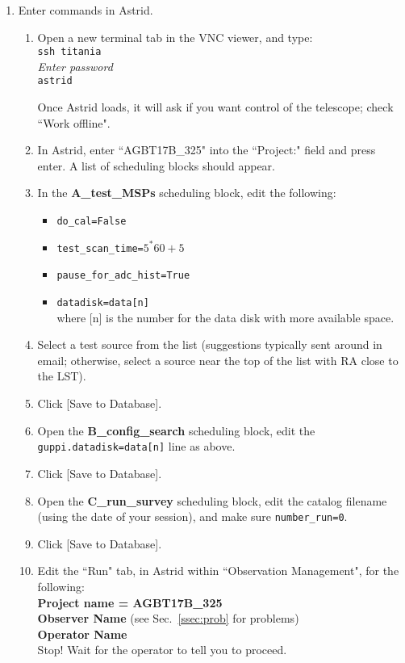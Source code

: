 \documentclass[11pt]{article}
\begin{document}
\begin{enumerate}
 \item Enter commands in Astrid. %
 \begin{enumerate}
  \item\label{st:ast} Open a new terminal tab in the VNC viewer, and type: \\ %
  \texttt{ssh titania}\\
  \emph{Enter password}\\
  \texttt{astrid} 

  Once Astrid loads, it will ask if you want control of the telescope; check ``Work offline".
  
  \item In Astrid, enter ``AGBT17B\_325" into the ``Project:" field and press enter. A list of scheduling blocks should appear. %
  \item In the \textbf{A\_test\_MSPs} scheduling block, edit the following: %

  \begin{itemize}
   \item \texttt{do\_cal=False} 
   \item \texttt{test\_scan\_time=$5^*60+5$}
   \item \texttt{pause\_for\_adc\_hist=True} 
   \item \texttt{datadisk=data[n]} \\
   where [n] is the number for the data disk with more available space. 
  \end{itemize}
  
  \item Select a test source from the list %
  (suggestions typically sent around in email; otherwise, select a source near the top of the list with RA close to the LST). 

  \item Click [Save to Database]. %
  \item Open the \textbf{B\_config\_search} scheduling block, edit the \texttt{guppi.datadisk=data[n]} line as above. %
  \item Click [Save to Database]. %
  \item Open the \textbf{C\_run\_survey} scheduling block, edit the catalog filename (using the date of your session), and make sure \texttt{number\_run=0}. %
  \item Click [Save to Database]. %
  \item Edit the ``Run" tab, in Astrid within ``Observation Management", for the following: \\ %
  \indent\textbf{Project name = AGBT17B\_325 \\
  \indent Observer Name} (see Sec.~\ref{ssec:prob} for problems)\\
  \indent \textbf{Operator Name} \\
  Stop! Wait for the operator to tell you to proceed.
 \end{enumerate}
\end{enumerate}
\end{document}
